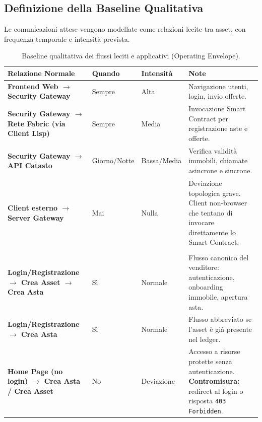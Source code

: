 \subsection{Definizione della Baseline Qualitativa}

Le comunicazioni attese vengono modellate come relazioni lecite tra asset, con frequenza temporale e intensità prevista.

\begin{table}[h]
\centering
\small
\renewcommand{\arraystretch}{1.4}
\begin{tabularx}{\textwidth}{>{\bfseries}p{3.8cm} p{2cm} p{1.6cm} X}
\toprule
\textbf{Relazione Normale} & \textbf{Quando} & \textbf{Intensità} & \textbf{Note} \\
\midrule
Frontend Web $\rightarrow$ Security Gateway &
    Sempre & Alta &
    Navigazione utenti, login, invio offerte. \\[4pt]
Security Gateway $\rightarrow$ Rete Fabric (via Client Lisp) &
    Sempre & Media &
    Invocazione Smart Contract per registrazione aste e offerte. \\[4pt]
Security Gateway $\rightarrow$ API Catasto &
    Giorno/Notte & Bassa/Media &
    Verifica validità immobili, chiamate asincrone e sincrone. \\[4pt]
Client esterno $\rightarrow$ Server Gateway &
    Mai & Nulla &
    Deviazione topologica grave. Client non-browser che tentano di invocare
    direttamente lo Smart Contract. \\[4pt]
\midrule
\multicolumn{4}{l}{\textit{Flussi utente (Seller/Buyer) — baseline applicativa}} \\
\midrule
Login/Registrazione $\rightarrow$ Crea Asset $\rightarrow$ Crea Asta &
    Sì & Normale &
    Flusso canonico del venditore: autenticazione, onboarding immobile, apertura asta. \\[4pt]
Login/Registrazione $\rightarrow$ Crea Asta &
    Sì & Normale &
    Flusso abbreviato se l'asset è già presente nel ledger. \\[4pt]
Home Page (no login) $\rightarrow$ Crea Asta / Crea Asset &
    No & Deviazione &
    Accesso a risorse protette senza autenticazione.
    \textbf{Contromisura:} redirect al login o risposta \texttt{403 Forbidden}. \\
\bottomrule
\end{tabularx}
\caption{Baseline qualitativa dei flussi leciti e applicativi (Operating Envelope).}
\label{tab:baseline}
\end{table}

